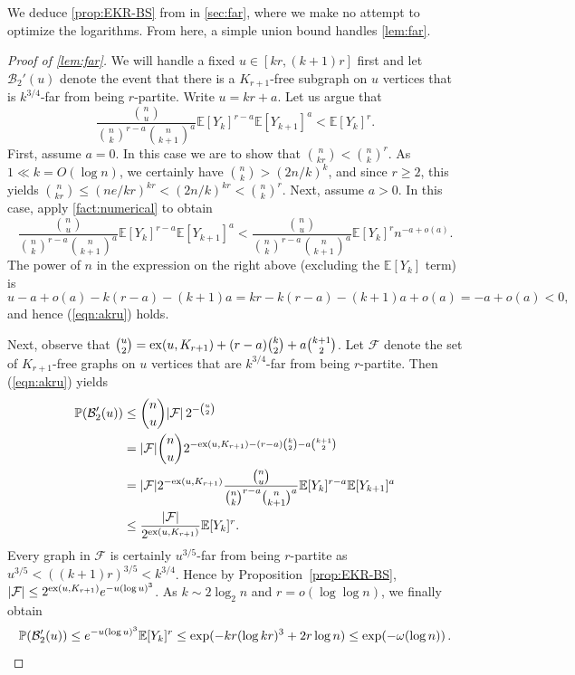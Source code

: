 \documentclass[11pt]{article}
\theoremstyle{definition}
\theoremstyle{remark}
\newcommand{\EE}{\mathbb{E}}
\newcommand{\cF}{\mathcal{F}}
\newcommand{\PP}{\mathbb{P}}
\newcommand{\cB}{\mathcal{B}}
\begin{document}
We deduce \cref{prop:EKR-BS} from \cite{balogh2019efficient} in \cref{sec:far}, where we make no attempt to optimize the logarithms.  From here, a simple union bound handles \cref{lem:far}.

\begin{proof}[Proof of \cref{lem:far}]
    We will handle a fixed $u \in [kr,(k+1)r]$ first and let $\cB_2'(u)$ denote the event that there is a $K_{r+1}$-free subgraph on $u$ vertices that is $k^{3/4}$-far from being $r$-partite. Write $ u =kr +a$.  Let us argue that
    \begin{equation} \label{eqn:akru}
    \frac{ \binom{n}{u}}{ \binom{n}{k}^{r-a} \binom{n}{k+1}^{a}} \EE[ Y_k]^{r-a} \EE[ Y_{k+1}]^a
        <\EE[Y_k]^r.
    \end{equation}
    First, assume $a=0$. In this case we are to show that ${n \choose kr}< {n \choose k}^r$.
    As $1 \ll k = O(\log n)$, we certainly have ${n \choose k}>(2n/k)^k$, and since $r \ge 2$, this yields
    ${n \choose kr}\le (ne/kr)^{kr}<(2n/k)^{kr} < {n \choose k}^r$. Next, assume $a>0$. In this case, apply \cref{fact:numerical} to obtain
     \begin{equation*} 
    \frac{ \binom{n}{u}}{ \binom{n}{k}^{r-a} \binom{n}{k+1}^{a}} \EE[ Y_k]^{r-a} \EE[ Y_{k+1}]^a
        <\frac{ \binom{n}{u}}{ \binom{n}{k}^{r-a} \binom{n}{k+1}^{a}} \EE[Y_k]^{r} n^{-a+o(a)}.
         \end{equation*}
         The power of $n$ in the expression on the right above (excluding the $\EE[Y_k]$ term) is
         $$u-a+o(a)-k(r-a)-(k+1)a=kr-k(r-a)-(k+1)a+o(a) = -a+o(a)<0,$$
         and hence (\ref{eqn:akru}) holds.
         
    Next, observe that ${u \choose 2} = {\rm ex}(u,K_{r+1}) +(r-a) \binom{k}{2} + a \binom{k+1}{2}$. Let $\cF$ denote the set of $K_{r+1}$-free graphs on $u$ vertices that are $k^{3/4}$-far from being $r$-partite. 
     Then (\ref{eqn:akru}) yields
      \begin{align*}
    \PP( \cB_2'(u)) &\le \binom{n}{u} | \cF| \, 2^{- \binom{u}{2}} \\
    &= |\cF| \binom{n}{u}
    2^{- {\rm ex}(u,K_{r+1}) -(r-a) \binom{k}{2} - a \binom{k+1}{2}} \\
    &= | \cF| 2^{-{\rm ex}(u, K_{r+1})} \frac{ \binom{n}{u}}{ \binom{n}{k}^{r-a} \binom{n}{k+1}^{a}} \EE[ Y_k]^{r-a} \EE[ Y_{k+1}]^a \\
    &\le \frac{ | \cF|}{ 2^{{\rm ex}(u, K_{r+1})}} \EE[Y_k]^r. 
       \end{align*}
    Every graph in $\cF$ is certainly $u^{3/5}$-far from being $r$-partite as $u^{3/5} < ((k+1)r)^{3/5} < k^{3/4}$. Hence by Proposition~\ref{prop:EKR-BS}, $|\cF|\le 2^{{\rm ex}(u, K_{r+1})}  e^{ - u (\log u)^3}$. As $k \sim 2 \log_2n$ and $r = o(\log\log n)$, we finally obtain 
    \begin{equation*}   \PP( \cB_2'(u)) \le e^{ - u (\log u)^3} \EE[Y_k]^r
    \leq \exp( -kr (\log kr)^3 + 2r \log n) 
    \leq \exp(-\omega(\log n))\,. \qedhere
    \end{equation*}
\end{proof}
\end{document}
